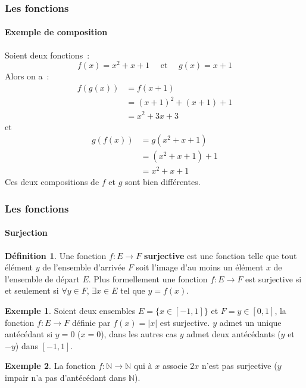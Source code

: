 \documentclass[10pt,notheorems]{beamer}
\theoremstyle{plain}
\theoremstyle{definition} %
\newtheorem{definition}{Définition}
\newtheorem{example}{Exemple}
\begin{document}
\begin{frame}
  \frametitle{Les fonctions}
  \framesubtitle{Exemple de composition}
  \hypertarget{slide_fonctions_composition_exemple}{}

  Soient deux fonctions~:
  \[
    f(x) = x^2+x+1 \quad\text{ et }\quad g(x) = x+1
  \]
  Alors on a~:
  \[
    \begin{split}
      f(g(x)) &= f(x+1)\\
      &= (x+1)^2+(x+1)+1\\
      &= x^2+3x+3
    \end{split}
  \]
  et
  \[
    \begin{split}
      g(f(x)) &= g(x^2+x+1)\\
      &= (x^2+x+1)+1\\
      &= x^2+x+1
    \end{split}
  \]
  Ces deux compositions de $f$ et $g$ sont bien différentes.

\end{frame}


\begin{frame}
  \frametitle{Les fonctions}
  \framesubtitle{Surjection}
  \hypertarget{slide_fonctions_surjection}{}

  \begin{definition}\label{def:surjection} Une fonction $f: E\longrightarrow F$ \textbf{surjective} est une fonction telle que tout élément $y$ de l'ensemble d'arrivée $F$ soit l'image d'au moins un élément $x$ de l'ensemble de départ $E$. Plus formellement une fonction $f: E\longrightarrow F$ est surjective si et seulement si $\forall y\in F$, $\exists x\in E$ tel que $y=f(x)$.
  \end{definition}

  \begin{example}\label{ex:surjection_1}
    Soient deux ensembles $E = \{x\in [-1,1]\}$ et $F = {y\in[0,1]}$, la fonction $f: E\longrightarrow F$ définie par $f(x) = |x|$ est surjective. $y$ admet un unique antécédant si $y=0$ ($x=0$), dans les autres cas $y$ admet deux antécédants ($y$ et $-y$) dans $[-1,1]$.
  \end{example}

  \begin{example}\label{ex:surjection_2}
    La fonction $f: \mathbb N \longrightarrow \mathbb N$ qui à $x$ associe $2x$ n'est pas surjective ($y$ impair n'a pas d'antécédant dans $\mathbb N$).
  \end{example}

\end{frame}
\end{document}
